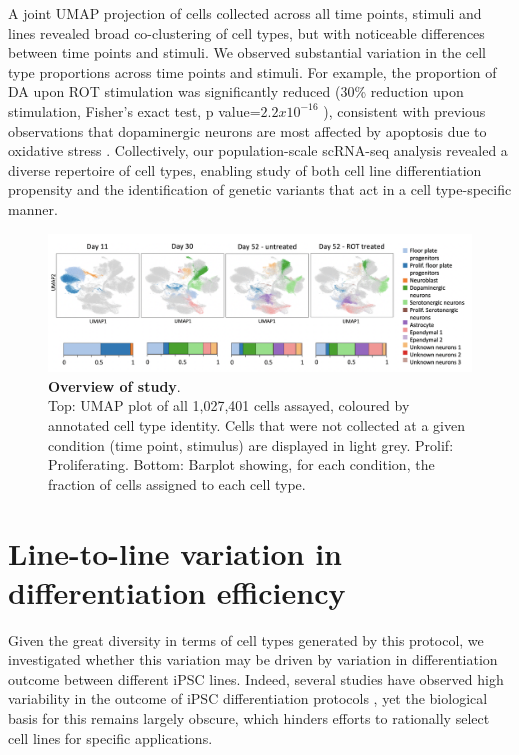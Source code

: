 A joint UMAP projection of cells collected across all time points, stimuli and lines revealed broad co-clustering of cell types, but with noticeable differences between time points and stimuli. 
We observed substantial variation in the cell type proportions across time points
and stimuli. 
For example, the proportion of DA upon ROT stimulation was significantly reduced (30\% reduction upon stimulation, Fisher’s exact test, p value=$2.2x10^{-16}$ ), consistent with previous observations that dopaminergic neurons are most affected by apoptosis due to oxidative stress \cite{sherer2003mechanism, knonagel1992autologous, cannon2009highly}.
Collectively, our population-scale scRNA-seq analysis revealed a diverse repertoire of cell types, enabling study of both cell line differentiation propensity and the identification of genetic variants that act in a cell type-specific manner.

\begin{figure}[h]
\centering
\includegraphics[width=16cm]{Chapter5/Fig/neuroseq_overview.png}
\caption[Overview of study]{\textbf{Overview of study}.\\
Top: UMAP plot of all 1,027,401 cells assayed, coloured by annotated cell type identity. Cells that were not collected at a given condition (time point, stimulus) are displayed in light grey. Prolif: Proliferating. 
Bottom: Barplot showing, for each condition, the fraction of cells assigned to each cell type.}
\label{fig:neuroseq_overview}
\end{figure}

\newpage

\section{Line-to-line variation in differentiation efficiency}

Given the great diversity in terms of cell types generated by this protocol, we investigated whether this variation may be driven by variation in differentiation outcome between different iPSC lines. 
Indeed, several studies have observed high variability in the outcome of iPSC differentiation protocols \cite{d2019association, volpato2018reproducibility}, yet the biological basis for this remains largely obscure, which hinders efforts to rationally select cell lines for specific applications. 

